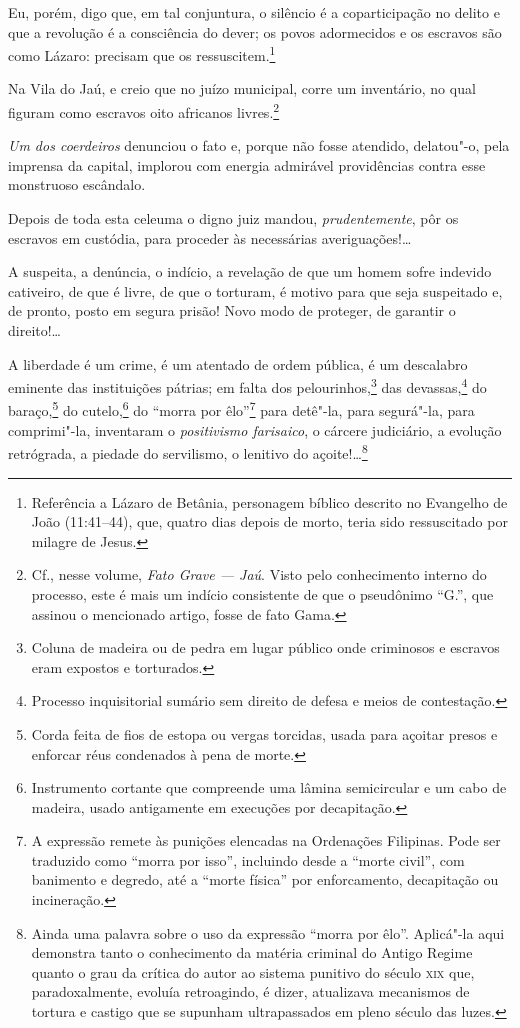 Eu, porém, digo que, em tal conjuntura, o silêncio é a coparticipação no
delito e que a revolução é a consciência do dever; os povos adormecidos
e os escravos são como Lázaro: precisam que os ressuscitem.\footnote{
  Referência a Lázaro de Betânia, personagem bíblico descrito no
  Evangelho de João (11:41--44), que, quatro dias depois de morto, teria
  sido ressuscitado por milagre de Jesus.}

Na Vila do Jaú, e creio que no juízo municipal, corre um inventário, no
qual figuram como escravos oito africanos livres.\footnote{Cf., nesse
  volume, \emph{Fato Grave --- Jaú}. Visto pelo conhecimento
  interno do processo, este é mais um indício consistente de que o
  pseudônimo ``G.'', que assinou o mencionado artigo, fosse de fato Gama.}

\emph{Um dos coerdeiros} denunciou o fato e, porque não fosse atendido,
delatou"-o, pela imprensa da capital, implorou com energia admirável
providências contra esse monstruoso escândalo.

Depois de toda esta celeuma o digno juiz mandou, \emph{prudentemente},
pôr os escravos em custódia, para proceder às necessárias
averiguações!\ldots{}

A suspeita, a denúncia, o indício, a revelação de que um homem sofre
indevido cativeiro, de que é livre, de que o torturam, é motivo para que
seja suspeitado e, de pronto, posto em segura prisão! Novo modo de
proteger, de garantir o direito!\ldots{}

A liberdade é um crime, é um atentado de ordem pública, é um descalabro
eminente das instituições pátrias; em falta dos pelourinhos,\footnote{
  Coluna de madeira ou de pedra em lugar público onde criminosos e
  escravos eram expostos e torturados.} das devassas,\footnote{
  Processo inquisitorial sumário sem direito de defesa e meios de
  contestação.} do baraço,\footnote{Corda feita de fios de estopa ou
  vergas torcidas, usada para açoitar presos e enforcar réus condenados
  à pena de morte.} do cutelo,\footnote{Instrumento cortante que
  compreende uma lâmina semicircular e um cabo de madeira, usado
  antigamente em execuções por decapitação.} do ``morra por
êlo''\footnote{A expressão remete às punições elencadas na Ordenações
  Filipinas. Pode ser traduzido como ``morra por isso'', incluindo desde a
  ``morte civil'', com banimento e degredo, até a ``morte física'' por
  enforcamento, decapitação ou incineração.} para detê"-la, para
segurá"-la, para comprimi"-la, inventaram o \emph{positivismo farisaico},
o cárcere judiciário, a evolução retrógrada, a piedade do servilismo, o
lenitivo do açoite!\ldots{}\footnote{Ainda uma palavra sobre o uso
  da expressão ``morra por êlo''. Aplicá"-la aqui demonstra tanto o
  conhecimento da matéria criminal do Antigo Regime quanto o grau da
  crítica do autor ao sistema punitivo do século \textsc{xix} que,
  paradoxalmente, evoluía retroagindo, é dizer, atualizava mecanismos de
  tortura e castigo que se supunham ultrapassados em pleno século das
  luzes.}

